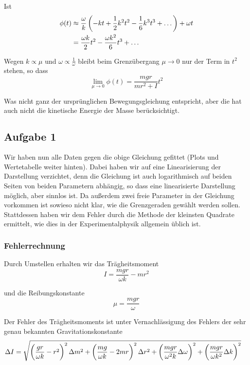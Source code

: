 \documentclass[a4paper,german,12pt,smallheadings]{scrartcl}
\begin{document}
Ist
\begin{align}
  \phi(t) &\approx \frac{\omega}{k}\del{-kt + \frac{1}{2}k^2t^2 - \frac{1}{6} k^3t^3 + \dots} + \omega t\\
          &= \frac{\omega k}{2} t^2 -  \frac{\omega k^2}{6} t^3 + \dots
\end{align}

Wegen $k \propto \mu$ und $\omega \propto \frac{1}{\omega}$ bleibt beim Grenzübergang $\mu \to 0$ nur der Term in $t^2$ stehen, so dass
\begin{equation}
  \lim_{\mu \to 0} \phi(t) = \frac{mgr}{mr^2 +I} t^2
\end{equation}

Was nicht ganz der ursprünglichen Bewegungsgleichung entspricht, aber die hat
auch nicht die kinetische Energie der Masse berücksichtigt.

\subsection{Aufgabe 1}
Wir haben nun alle Daten gegen die obige Gleichung gefittet (Plots und
Wertetabelle weiter hinten). Dabei haben wir auf eine Linearisierung der
Darstellung verzichtet, denn die Gleichung ist auch logarithmisch auf beiden
Seiten von beiden Parametern abhängig, so dass eine linearisierte Darstellung
möglich, aber sinnlos ist. Da außerdem zwei freie Parameter in der Gleichung
vorkommen ist sowieso nicht klar, wie die Grenzgeraden gewählt werden sollen.
Stattdessen haben wir dem Fehler durch die Methode der kleinsten Quadrate
ermittelt, wie dies in der Experimentalphysik allgemein üblich ist.

\subsubsection{Fehlerrechnung}
Durch Umstellen erhalten wir das Trägheitsmoment
\begin{equation}
  I = \frac{mgr}{\omega k} - mr^2
\end{equation}

und die Reibungskonstante
\begin{equation}
  \mu = \frac{mgr}{\omega}
\end{equation}

Der Fehler des Trägheitsmoments ist unter Vernachlässigung des Fehlers der sehr
genau bekannten Gravitationskonstante %
\begin{align*}
  \Delta I
  &= \sqrt{
  \del{\frac{gr}{\omega k} - r^2}^2 \Delta m^2 +
  \del{\frac{mg}{\omega k} - 2mr}^2 \Delta r^2 +
  \del{\frac{mgr}{\omega^2k} \Delta \omega}^2 +
  \del{\frac{mgr}{\omega k^2} \Delta k}^2
  }
\end{align*}
\end{document}
